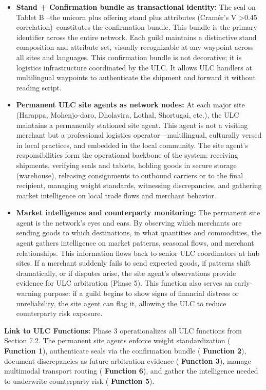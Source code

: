 \documentclass[12pt]{article}
\begin{document}
\begin{itemize}

\item \textbf{Stand + Confirmation bundle as transactional identity:} The seal on
Tablet B --the unicorn plus offering stand plus attributes (Cram{\'e}r's
V \textgreater 0.45 correlation)--constitutes the confirmation bundle. This bundle
is the primary identifier across the entire network. Each guild maintains a distinctive
stand composition and attribute set, visually recognizable at any waypoint across all
sites and languages. This confirmation bundle is not decorative; it is logistics
infrastructure coordinated by the ULC. It allows ULC handlers at multilingual waypoints
to authenticate the shipment and forward it without reading script.

\item \textbf{Permanent ULC site agents as network nodes:} At each major site
(Harappa, Mohenjo-daro, Dholavira, Lothal, Shortugai, etc.), the ULC maintains
a permanently stationed site agent. This agent is not a visiting merchant but
a professional logistics operator—multilingual, culturally versed in local
practices, and embedded in the local community. The site agent's
responsibilities form the operational backbone of the system: receiving
shipments, verifying seals and tablets, holding goods in secure storage
(warehouse), releasing consignments to outbound carriers or to the final
recipient, managing weight standards, witnessing discrepancies, and gathering
market intelligence on local trade flows and merchant behavior.

\item \textbf{Market intelligence and counterparty monitoring:} The permanent
site agent is the network's eyes and ears. By observing which merchants are
sending goods to which destinations, in what quantities and commodities, the
agent gathers intelligence on market patterns, seasonal flows, and merchant
relationships. This information flows back to senior ULC coordinators at hub
sites. If a merchant suddenly fails to send expected goods, if patterns shift
dramatically, or if disputes arise, the site agent's observations provide
evidence for ULC arbitration (Phase 5). This function also serves an
early-warning purpose: if a guild begins to show signs of financial distress
or unreliability, the site agent can flag it, allowing the ULC to reduce
counterparty risk exposure.
\end{itemize}

\textbf{Link to ULC Functions:} Phase 3 operationalizes all ULC functions
from Section 7.2. The permanent site agents enforce weight standardization
( \textbf{Function 1}), authenticate seals via the confirmation bundle
( \textbf{Function 2}), document discrepancies as future arbitration
evidence ( \textbf{Function 3}), manage multimodal transport routing
( \textbf{Function 6}), and gather the intelligence needed to underwrite
counterparty risk ( \textbf{Function 5}).
\end{document}
